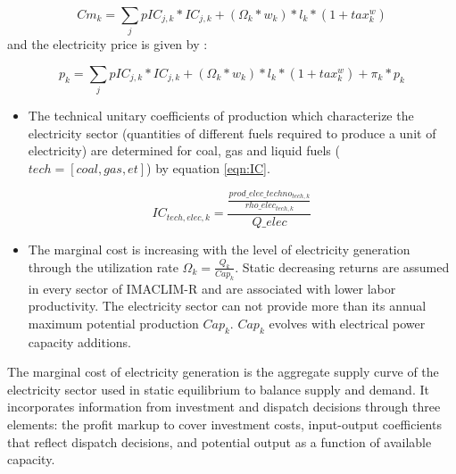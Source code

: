 \begin{dmath}
    Cm_{k} = \sum_{j}{}pIC_{j,k}*IC_{j,k} + (\Omega_{k}*w_{k})*l_{k}*(1+tax_{k}^{w})
    \label{eqn:Cm}
\end{dmath}
and the electricity price is given by : 

\begin{dmath}
    p_{k} = \sum_{j}{}pIC_{j,k}*IC_{j,k} + (\Omega_{k}*w_{k})*l_{k}*(1+tax_{k}^{w}) + \pi_{k} * p_{k}
    \label{eqn:Cm}
\end{dmath}
\begin{itemize}
    \item The technical unitary coefficients of production which characterize the electricity sector (quantities of different fuels required to produce a unit of electricity) are determined for coal, gas and liquid fuels ($tech = [coal,gas,et]$) by equation \ref{eqn:IC}.
\end{itemize}


\begin{dmath}
    IC_{tech,elec,k} = \frac{\frac{prod\_elec\_techno_{tech,k}}{rho\_elec_{tech,k}}}{Q\_elec}
    \label{eqn:IC}
\end{dmath}

\begin{itemize}
    \item The marginal cost is increasing with the level of electricity generation through the utilization rate $\Omega_{k} = \frac{Q_{k}}{Cap_{k}}$. Static decreasing returns are assumed in every sector of IMACLIM-R and are associated with lower labor productivity. The electricity sector can not provide more than its annual maximum potential production $Cap_{k}$.
$Cap_{k}$ evolves with electrical power capacity additions.
\end{itemize}

The marginal cost of electricity generation is the aggregate supply curve of the electricity sector used in static equilibrium to balance supply and demand. It incorporates information from investment and dispatch decisions through three elements: the profit markup to cover investment costs, input-output coefficients that reflect dispatch decisions, and potential output as a function of available capacity.

